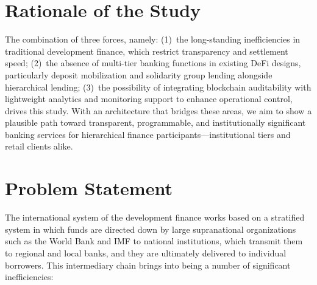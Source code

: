 \documentclass[12pt,a4paper]{report}
\begin{document}
\section{Rationale of the Study}
\label{sec:rationale}

The combination of three forces, namely: (1)~the long-standing inefficiencies in traditional development finance, which restrict transparency and settlement speed; (2)~the absence of multi-tier banking functions in existing DeFi designs, particularly deposit mobilization and solidarity group lending alongside hierarchical lending; (3)~the possibility of integrating blockchain auditability with lightweight analytics and monitoring support to enhance operational control, drives this study. With an architecture that bridges these areas, we aim to show a plausible path toward transparent, programmable, and institutionally significant banking services for hierarchical finance participants---institutional tiers and retail clients alike.

\section{Problem Statement}
\label{sec:problem-statement}

The international system of the development finance works based on a stratified system in which funds are directed down by large supranational organizations such as the World Bank and IMF to national institutions, which transmit them to regional and local banks, and they are ultimately delivered to individual borrowers. This intermediary chain brings into being a number of significant inefficiencies:
\end{document}
